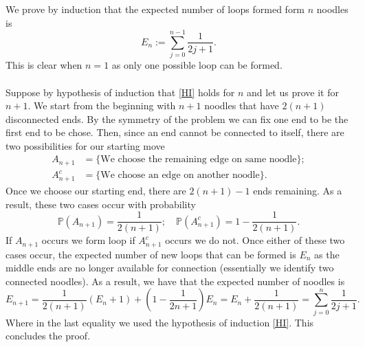 \documentclass[12pt]{article}
\begin{document}
\begin{CJK*}{UTF8}{gbsn}
	We prove by induction that the expected number of loops formed form $n$ noodles is
	\begin{equation}\label{HI}
		E_n:=\sum_{j=0}^{n-1} \frac{1}{2j+1}.
	\end{equation}
	This is clear when $n=1$ as only one possible loop can be formed.\\
	\\
	Suppose by hypothesis of induction that \eqref{HI} holds for $n$ and let us prove it for $n+1$. We start from the beginning with $n+1$ noodles
	that have  $2(n+1)$ disconnected ends. By the symmetry of the problem we can fix one end to be the first end to be chose. Then, since an end cannot be connected to itself, there are two possibilities for our starting move
	\begin{align*}
		A_{n+1} & =\{\text{We choose the remaining edge on same noodle} \}; \\A^c_{n+1} & =\{\text{We choose an edge on another noodle} \} .
	\end{align*}
	Once we choose our starting end, there are $2(n+1)-1$ ends remaining. As a result, these two cases occur with probability
	\begin{equation*}
		\mathbb{P}(A_{n+1})=\frac{1}{2(n+1)};\quad \mathbb{P}(A_{n+1}^c)=1-\frac{1}{2(n+1)}.
	\end{equation*}
	If $A_{n+1}$ occurs we form loop if $A_{n+1}^c$ occurs we do not. Once either of these two cases occur, the expected number of new loops that can be formed is $E_n$ as the middle ends are no longer available for connection (essentially we identify two connected noodles). As a result, we have that the expected number of noodles is
	\begin{equation*}
		E_{n+1}=\frac{1}{2(n+1)}(E_n+1)+(1-\frac{1}{2n+1})E_n=E_n+ \frac{1}{2(n+1)}=\sum_{j=0}^{n} \frac{1}{2j+1}.
	\end{equation*}
	Where in the last equality we used the hypothesis of induction  \eqref{HI}. This concludes the proof.

\end{CJK*}




\end{document}
